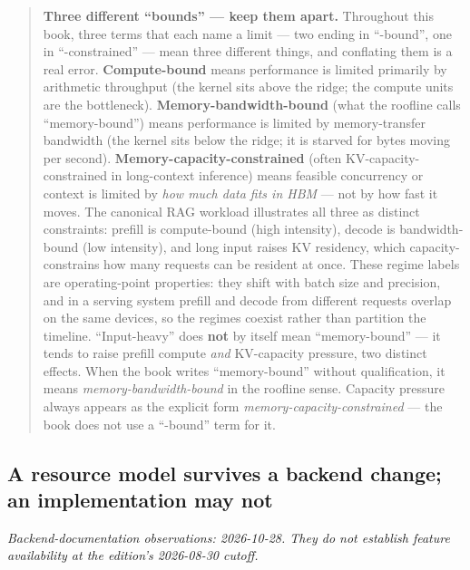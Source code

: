 \begin{quote}
\textbf{Three different ``bounds'' --- keep them apart.} Throughout this
book, three terms that each name a limit --- two ending in ``-bound'',
one in ``-constrained'' --- mean three different things, and conflating
them is a real error. \textbf{Compute-bound} means performance is
limited primarily by arithmetic throughput (the kernel sits above the
ridge; the compute units are the bottleneck).
\textbf{Memory-bandwidth-bound} (what the roofline calls
``memory-bound'') means performance is limited by memory-transfer
bandwidth (the kernel sits below the ridge; it is starved for bytes
moving per second). \textbf{Memory-capacity-constrained} (often
KV-capacity-constrained in long-context inference) means feasible
concurrency or context is limited by \emph{how much data fits in HBM}
--- not by how fast it moves. The canonical RAG workload illustrates all
three as distinct constraints: prefill is compute-bound (high
intensity), decode is bandwidth-bound (low intensity), and long input
raises KV residency, which capacity-constrains how many requests can be
resident at once. These regime labels are operating-point properties:
they shift with batch size and precision, and in a serving system
prefill and decode from different requests overlap on the same devices,
so the regimes coexist rather than partition the timeline.
``Input-heavy'' does \textbf{not} by itself mean ``memory-bound'' --- it
tends to raise prefill compute \emph{and} KV-capacity pressure, two
distinct effects. When the book writes ``memory-bound'' without
qualification, it means \emph{memory-bandwidth-bound} in the roofline
sense. Capacity pressure always appears as the explicit form
\emph{memory-capacity-constrained} --- the book does not use a
``-bound'' term for it.
\end{quote}

\subsection{A resource model survives a backend change; an
implementation may
not}\label{a-resource-model-survives-a-backend-change-an-implementation-may-not}

\emph{Backend-documentation observations: 2026-10-28. They do not
establish feature availability at the edition's 2026-08-30 cutoff.}

